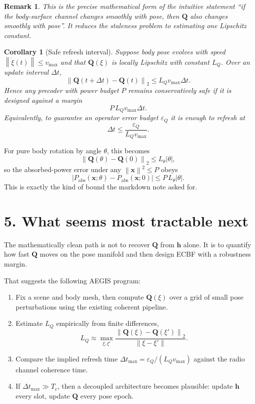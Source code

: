 \documentclass[11pt]{article}
\newtheorem{remark}{Remark}
\newtheorem{corollary}{Corollary}
\newcommand{\hh}{\mathbf{h}}
\newcommand{\QQ}{\mathbf{Q}}
\newcommand{\x}{\mathbf{x}}
\newcommand{\norm}[1]{\left\lVert #1 \right\rVert}
\newcommand{\abs}[1]{\left\lvert #1 \right\rvert}
\begin{document}
\begin{remark}
This is the precise mathematical form of the intuitive statement
``if the body-surface channel changes smoothly with pose, then $\QQ$ also
changes smoothly with pose''. It reduces the staleness problem to estimating
one Lipschitz constant.
\end{remark}

\begin{corollary}[Safe refresh interval]
Suppose body pose evolves with speed $\norm{\dot{\xi}(t)}\le v_{\max}$ and
that $\QQ(\xi)$ is locally Lipschitz with constant $L_Q$. Over an update
interval $\Delta t$,
\begin{equation}
  \norm{\QQ(t+\Delta t)-\QQ(t)}_2 \le L_Q v_{\max}\Delta t.
\end{equation}
Hence any precoder with power budget $P$ remains conservatively safe if it
is designed against a margin
\begin{equation}
  P\,L_Q v_{\max}\Delta t.
\end{equation}
Equivalently, to guarantee an operator error budget $\varepsilon_Q$ it is
enough to refresh at
\begin{equation}
  \Delta t \le \frac{\varepsilon_Q}{L_Q v_{\max}}.
\end{equation}
\end{corollary}

For pure body rotation by angle $\theta$, this becomes
\begin{equation}
  \norm{\QQ(\theta)-\QQ(0)}_2 \le L_\theta \abs{\theta},
\end{equation}
so the absorbed-power error under any $\norm{\x}^2\le P$ obeys
\begin{equation}
  \abs{P_{\mathrm{abs}}(\x;\theta)-P_{\mathrm{abs}}(\x;0)}
  \le P\,L_\theta \abs{\theta}.
\end{equation}
This is exactly the kind of bound the markdown note asked for.

\section*{5. What seems most tractable next}

The mathematically clean path is not to recover $\QQ$ from $\hh$ alone.
It is to quantify how fast $\QQ$ moves on the pose manifold and then design
ECBF with a robustness margin.

That suggests the following AEGIS program:
\begin{enumerate}
  \item Fix a scene and body mesh, then compute $\QQ(\xi)$ over a grid of
  small pose perturbations using the existing coherent pipeline.
  \item Estimate $L_Q$ empirically from finite differences,
  \[
    L_Q \approx \max_{\xi,\xi'} \frac{\norm{\QQ(\xi)-\QQ(\xi')}_2}{\norm{\xi-\xi'}}.
  \]
  \item Compare the implied refresh time
  $\Delta t_{\max}=\varepsilon_Q/(L_Q v_{\max})$ against the radio channel
  coherence time.
  \item If $\Delta t_{\max}\gg T_c$, then a decoupled architecture becomes
  plausible: update $\hh$ every slot, update $\QQ$ every pose epoch.
\end{enumerate}
\end{document}
